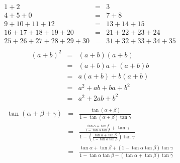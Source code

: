\documentclass{article}
\begin{document}
\begin{eqnarray*}
1 + 2 &=& 3 \\
4 + 5 + 0 &=& 7 + 8 \\
9 + 10 + 11 + 12 &=& 13 + 14 + 15 \\
16 + 17 + 18 + 19 + 20 &=& 21 + 22 + 23 + 24 \\
25 + 26 + 27 + 28 + 29 + 30 &=& 31 + 32 + 33 + 34 + 35 \\
\end{eqnarray*}
\begin{eqnarray*}
(a + b)^2 &=& (a + b)(a + b) \\
&=&(a + b)a + (a + b)b\\ 
&=& a(a + b) + b(a + b) \\
&=& a^2 + ab + ba + b^2 \\
&=& a^2 + 2ab + b^2 \\
\end{eqnarray*}
\begin{eqnarray*}
\tan(\alpha + \beta + \gamma) &=& \frac{\tan(\alpha + \beta)}{1-\tan(\alpha + \beta)\tan\gamma} \\
 &=&\frac{\frac{\tan \alpha+\tan \beta}{1- \tan \alpha \tan \beta}+ \tan \gamma}{1- \left ( \frac{\tan \alpha+ \tan \beta}{1- \tan \alpha \tan \beta} \right) \tan \gamma} \\
 &=& \frac{\tan\alpha+\tan\beta+(1-\tan\alpha\tan\beta)\tan\gamma}{1-\tan\alpha\tan\beta-(\tan\alpha+\tan\beta)\tan\gamma}\\
\end{eqnarray*}
\end{document}
